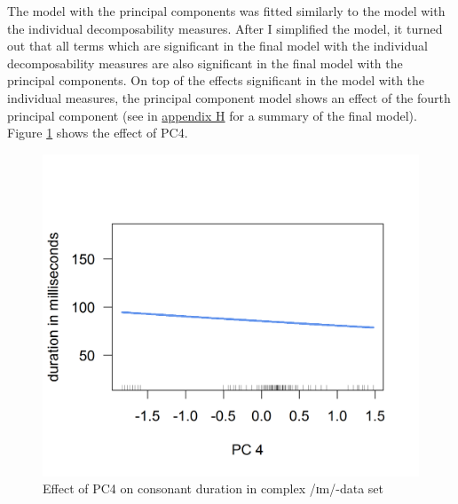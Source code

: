 The model with the principal components was fitted similarly to the model with the individual decomposability measures. After I simplified the model, it turned out that all terms which are significant in the final model with the individual decomposability measures are also significant in the final model with the principal components. On top of the effects significant in the model with the individual measures, the principal component model shows an effect of the fourth principal component (see  in \hyperref[Appendix H: Model Summaries Experiment]{appendix H} for a summary of the final model). Figure \ref{fig:PC 4 imComplex experiment} shows the effect of \textsc{PC4}.

\begin{figure} [h!]
	\centering

	\includegraphics [scale=0.5] {images/Experiment/imModelPC}
	\caption{Effect of PC4 on consonant duration in complex /ɪm/-data set}
	\label{fig:PC 4 imComplex experiment}

\end{figure}



